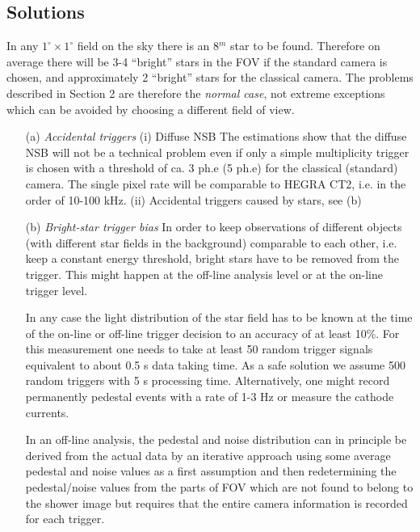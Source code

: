 \subsection{Solutions}

\medskip In any $1^\circ \times 1^\circ$ field on the sky there is an 8$^m$ star to
be found. Therefore on average there will be 3-4 ``bright'' stars in the FOV
if the standard camera is chosen, and approximately 2 ``bright'' stars for
the classical camera. The problems described in Section 2 are therefore the 
{\em normal case}, not extreme exceptions which can be avoided by choosing a
different field of view.

\begin{itemize}
\item[(a)]  {\em Accidental triggers}\newline
(i) Diffuse NSB\newline
The estimations show that the diffuse NSB will not be a technical problem
even if only a simple multiplicity trigger is chosen with a threshold of ca.
3 ph.e (5 ph.e) for the classical (standard) camera. The single pixel rate
will be comparable to HEGRA CT2, i.e. in the order of 10-100 kHz.\newline
(ii) Accidental triggers caused by stars, see (b)

\item[(b)]  {\em Bright-star trigger bias}\newline
In order to keep observations of different objects (with different star
fields in the background) comparable to each other, i.e. keep a constant
energy threshold, bright stars have to be removed from the trigger. This
might happen at the off-line analysis level or at the on-line trigger level.

In any case the light distribution of the star field has to be known at the
time of the on-line or off-line trigger decision to an accuracy of at least
10\%. For this measurement one needs to take at least 50 random trigger
signals equivalent to about 0.5 s data taking time. As a safe solution we
assume 500 random triggers with 5 s processing time. Alternatively, one
might record permanently pedestal events with a rate of 1-3 Hz
or measure the cathode currents.

In an off-line analysis, the pedestal and noise distribution can in
principle be derived from the actual data by an iterative approach using
some average pedestal and noise values as a first assumption and then
redetermining the pedestal/noise values from the parts of FOV which are not
found to belong to the shower image but requires that the entire camera
information is recorded for each trigger.


\end{itemize}
